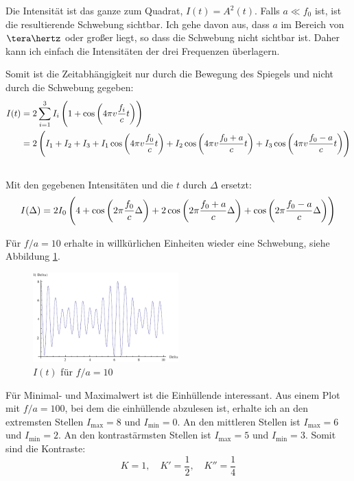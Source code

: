Die Intensität ist das ganze zum Quadrat, $I(t) = A^2(t)$. Falls $a \ll f_0$
ist, ist die resultierende Schwebung sichtbar. Ich gehe davon aus, dass $a$ im
Bereich von $\tera\hertz$ oder großer liegt, so dass die Schwebung nicht
sichtbar ist. Daher kann ich einfach die Intensitäten der drei Frequenzen
überlagern.

Somit ist die Zeitabhängigkeit nur durch die Bewegung des Spiegels und nicht
durch die Schwebung gegeben:
\begin{align*}
	I(t)
	&= 2 \sum_{i = 1}^3 I_i \del{1 + \cos\del{4 \pi v \frac {f_i}c t}} \\
	&= 2 \del{I_1 + I_2 + I_3 +
		I_1 \cos\del{4 \pi v \frac {f_0}c t}
		+
		I_2 \cos\del{4 \pi v \frac {f_0 + a}c t}
		+
		I_3 \cos\del{4 \pi v \frac {f_0 - a}c t}
	}
\end{align*}

\subsection{}

Mit den gegebenen Intensitäten und die $t$ durch $\Delta$ ersetzt:
\[
	I(\Delta) = 2 I_0 \del{4 + 
		\cos\del{2 \pi \frac {f_0}c \Delta}
		+
		2 \cos\del{2 \pi \frac {f_0 + a}c \Delta}
		+
		\cos\del{2 \pi \frac {f_0 - a}c \Delta}
	}
\]

Für $f/a = 10$ erhalte in willkürlichen Einheiten wieder eine Schwebung, siehe
Abbildung \ref{schwebung}.

\begin{figure}
	\centering
	\includegraphics[width=0.5\textwidth]{schwebung.pdf}
	\caption{$I(t)$ für $f/a = 10$}
	\label{schwebung}
\end{figure}

Für Minimal- und Maximalwert ist die Einhüllende interessant. Aus einem Plot
mit $f/a = 100$, bei dem die einhüllende abzulesen ist, erhalte ich an den
extremsten Stellen $I_\text{max} = 8$ und $I_\text{min} = 0$. An den mittleren
Stellen ist $I_\text{max} = 6$ und $I_\text{min} = 2$. An den kontrastärmsten
Stellen ist $I_\text{max} = 5$ und $I_\text{min} = 3$. Somit sind die
Kontraste:
\[
	K = 1
	,\quad
	K' = \frac 12
	,\quad
	K'' = \frac 14
\]

